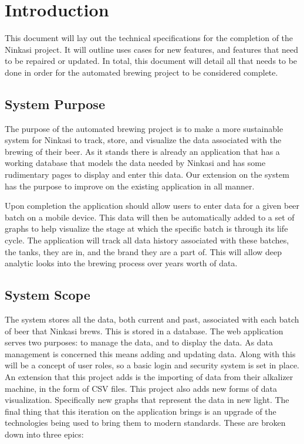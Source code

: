\section{Introduction}

This document will lay out the technical specifications for the completion of the Ninkasi project.  It will outline uses cases for new features, and features that need to be repaired or updated.  In total, this document will detail all that needs to be done in order for the automated brewing project to be considered complete.

    \subsection{System Purpose}

    The purpose of the automated brewing project is to make a more sustainable system for Ninkasi to track, store, and visualize the data associated with the brewing of their beer.  As it stands there is already an application that has a working database that models the data needed by Ninkasi and has some rudimentary pages to display and enter this data.  Our extension on the system has the purpose to improve on the existing application in all manner.
    
    Upon completion the application should allow users to enter data for a given beer batch on a mobile device.  This data will then be automatically added to a set of graphs to help visualize the stage at which the specific batch is through its life cycle.  The application will track all data history associated with these batches, the tanks, they are in, and the brand they are a part of.  This will allow deep analytic looks into the brewing process over years worth of data.
    
    \subsection{System Scope}
    
    The system stores all the data, both current and past, associated with each batch of beer that Ninkasi brews.  This is stored in a database.  The web application serves two purposes: to manage the data, and to display the data.  As data management is concerned this means adding and updating data.  Along with this will be a concept of user roles, so a basic login and security system is set in place.  An extension that this project adds is the importing of data from their alkalizer machine, in the form of CSV files.  This project also adds new forms of data visualization.  Specifically new graphs that represent the data in new light.  The final thing that this iteration on the application brings is an upgrade of the technologies being used to bring them to modern standards.  These are broken down into three epics:
    
